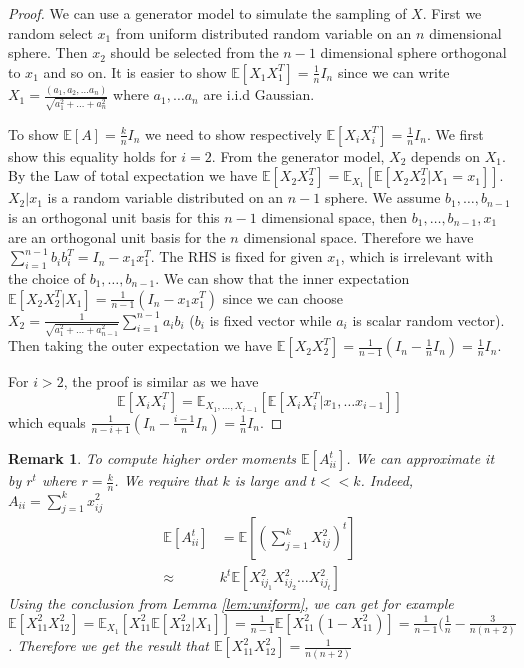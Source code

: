 \documentclass{article}
\def\E{\mathbb{E}}
\newtheorem{remark}{Remark}
\begin{document}
\begin{proof}
We can use a generator model to simulate the sampling of $X$.
First we random select $x_1$
from uniform distributed random variable on an $n$ dimensional sphere.
Then $x_2$ should be selected from the $n-1$ dimensional sphere
orthogonal to $x_1$ and so on.
It is easier to show $\E[X_1X_1^T] = \frac{1}{n} I_n$
since we can write
$X_1 = \frac{(a_1, a_2, \dots a_n) }{\sqrt{a_1^2+\dots + a_n^2}}$
where $a_1, \dots a_n$ are i.i.d Gaussian.

To show $\E[A]=\frac{k}{n}I_n$ we need to show respectively
$\E[X_iX_i^T]=\frac{1}{n} I_n$.
We first show this equality holds for $i=2$.
From the generator model, $X_2$ depends on $X_1$.
By the Law of total expectation we have
$\E[X_2 X_2^T] = \E_{X_1}[\E[X_2 X_2^T |X_1 = x_1]]$.
$X_2 | x_1$ is a random variable distributed on an $n-1$ sphere.
We assume $b_1, \dots, b_{n-1}$ is an orthogonal unit basis
for this $n-1$ dimensional space,
then $b_1, \dots, b_{n-1}, x_1$ are an orthogonal unit basis
for the $n$ dimensional space. Therefore we have
$\sum_{i=1}^{n-1} b_i b_i^T = I_n -  x_1 x_1^T $.
The RHS is fixed for given $x_1$,
which is irrelevant with the choice of $b_1, \dots, b_{n-1}$.
We can show that the inner expectation
$\E[X_2 X_2^T |X_1] = \frac{1}{n-1}(I_n - x_1 x_1^T)$
since we can choose
$X_2 = \frac{1}{\sqrt{a_1^2 + \dots + a_{n-1}^2}}\sum_{i=1}^{n-1} a_i b_i$
($b_i$ is fixed vector while $a_i$ is scalar random vector).
Then taking the outer expectation we have
$\E[X_2 X_2^T] = \frac{1}{n-1} (I_n - \frac{1}{n} I_n) = \frac{1}{n} I_n$.

For $i>2$, the proof is similar as we have
$$
\E[X_i X_i^T] =
\E_{X_1, \dots, X_{i-1}} [\E[X_i X_i^T | x_1, \dots x_{i-1}]]
$$
which equals $\frac{1}{n-i+1}(I_n - \frac{i-1}{n} I_n) = \frac{1}{n} I_n$.
\end{proof}
\begin{remark}
To compute higher order moments $\E[A_{ii}^t]$.
We can approximate it by $r^t$ where $r=\frac{k}{n}$.
We require that $k$ is large and  $ t << k$.
Indeed, $A_{ii} = \sum_{j=1}^k x_{ij}^2$
\begin{align*}
\E[A^t_{ii}] & = \E[(\sum_{j=1}^k X_{ij}^2)^t] \\
\approx & k^t \E[X^2_{ij_1}X^2_{ij_2}\dots X^2_{ij_t}]
\end{align*}
Using the conclusion from Lemma \ref{lem:uniform},
we can get for example $\E[X_{11}^2 X_{12}^2]
= \E_{X_1}[X_{11}^2 \E[ X^2_{12}| X_1]]
= \frac{1}{n-1}\E[X_{11}^2 ( 1 - X_{11}^2 )] = \frac{1}{n-1}(\frac{1}{n} - \frac{3}{n(n+2)}$.
Therefore we get the result that $\E[X_{11}^2 X_{12}^2]  =  \frac{1}{n(n+2)}$
\end{remark}
\end{document}
